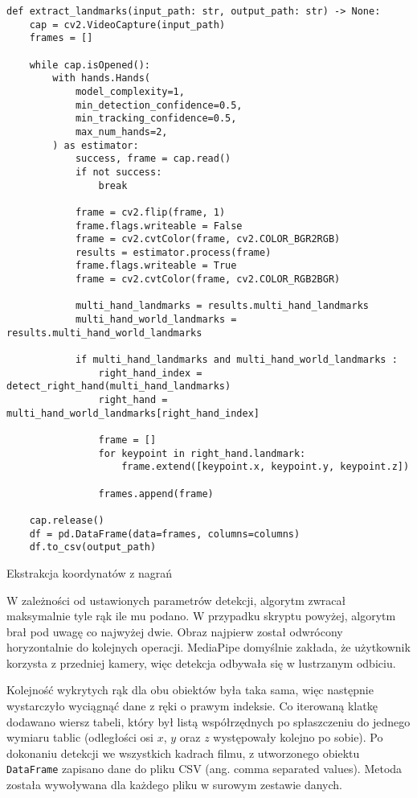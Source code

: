\begin{listing}[H]
    \color{white}
    \begin{verbatim}
def extract_landmarks(input_path: str, output_path: str) -> None:
    cap = cv2.VideoCapture(input_path)
    frames = []

    while cap.isOpened():
        with hands.Hands(
            model_complexity=1,
            min_detection_confidence=0.5,
            min_tracking_confidence=0.5,
            max_num_hands=2,
        ) as estimator:
            success, frame = cap.read()
            if not success:
                break

            frame = cv2.flip(frame, 1)
            frame.flags.writeable = False
            frame = cv2.cvtColor(frame, cv2.COLOR_BGR2RGB)
            results = estimator.process(frame)
            frame.flags.writeable = True
            frame = cv2.cvtColor(frame, cv2.COLOR_RGB2BGR)

            multi_hand_landmarks = results.multi_hand_landmarks
            multi_hand_world_landmarks = results.multi_hand_world_landmarks

            if multi_hand_landmarks and multi_hand_world_landmarks :
                right_hand_index = detect_right_hand(multi_hand_landmarks)
                right_hand = multi_hand_world_landmarks[right_hand_index]

                frame = []
                for keypoint in right_hand.landmark:
                    frame.extend([keypoint.x, keypoint.y, keypoint.z])

                frames.append(frame)

    cap.release()
    df = pd.DataFrame(data=frames, columns=columns)
    df.to_csv(output_path)
    \end{verbatim}
    \caption{Ekstrakcja koordynatów z nagrań}
    \label{lst:recordings-landmarks-extraction}
\end{listing}

W zależności od ustawionych parametrów detekcji, algorytm zwracał maksymalnie tyle rąk ile mu podano. W przypadku skryptu powyżej, algorytm brał pod uwagę co najwyżej dwie. Obraz najpierw został odwrócony horyzontalnie do kolejnych operacji. MediaPipe domyślnie zakłada, że użytkownik korzysta z przedniej kamery, więc detekcja odbywała się w lustrzanym odbiciu.

Kolejność wykrytych rąk dla obu obiektów była taka sama, więc następnie wystarczyło wyciągnąć dane z ręki o prawym indeksie. Co iterowaną klatkę dodawano wiersz tabeli, który był listą współrzędnych po spłaszczeniu do jednego wymiaru tablic (odległości osi $x$, $y$ oraz $z$ występowały kolejno po sobie). Po dokonaniu detekcji we wszystkich kadrach filmu, z utworzonego obiektu \texttt{DataFrame} zapisano dane do pliku CSV (ang. comma separated values). Metoda została wywoływana dla każdego pliku w surowym zestawie danych.


